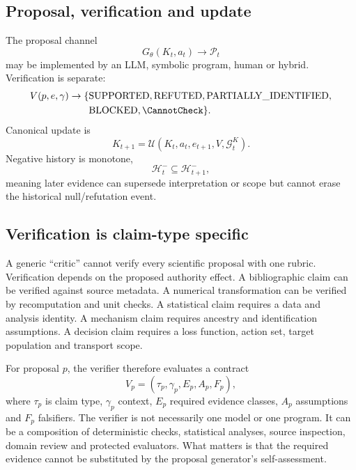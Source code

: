 \subsection{Proposal, verification and update}
The proposal channel
\begin{equation}G_\theta(K_t,a_t)\rightarrow\mathcal P_t\end{equation}
may be implemented by an LLM, symbolic program, human or hybrid. Verification is separate:
\begin{equation}
\begin{aligned}
V(p,e,\gamma)\rightarrow\{&\mathrm{SUPPORTED},\mathrm{REFUTED},\mathrm{PARTIALLY\_IDENTIFIED},\\
&\mathrm{BLOCKED},\CannotCheck\}.
\end{aligned}
\end{equation}
Canonical update is
\begin{equation}K_{t+1}=\mathcal U(K_t,a_t,e_{t+1},V,\mathcal G_t^K).\end{equation}
Negative history is monotone,
\begin{equation}\mathcal H_t^{-}\subseteq\mathcal H_{t+1}^{-},\end{equation}
meaning later evidence can supersede interpretation or scope but cannot erase the historical null/refutation event.

\subsection{Verification is claim-type specific}

A generic ``critic'' cannot verify every scientific proposal with one rubric. Verification depends on the proposed authority effect. A bibliographic claim can be verified against source metadata. A numerical transformation can be verified by recomputation and unit checks. A statistical claim requires a data and analysis identity. A mechanism claim requires ancestry and identification assumptions. A decision claim requires a loss function, action set, target population and transport scope.

For proposal \(p\), the verifier therefore evaluates a contract
\[
V_p=(\tau_p,\gamma_p,E_p,A_p,F_p),
\]
where \(\tau_p\) is claim type, \(\gamma_p\) context, \(E_p\) required evidence classes, \(A_p\) assumptions and \(F_p\) falsifiers. The verifier is not necessarily one model or one program. It can be a composition of deterministic checks, statistical analyses, source inspection, domain review and protected evaluators. What matters is that the required evidence cannot be substituted by the proposal generator's self-assessment.

